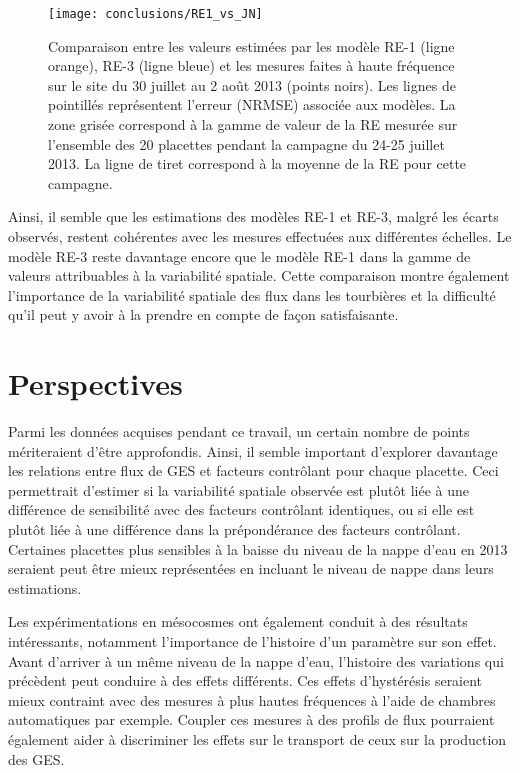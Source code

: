 \begin{figure}
\centering
\texttt{[image: conclusions/RE1\_vs\_JN]}
\caption{Comparaison entre les valeurs estimées par les modèle RE-1 (ligne orange), RE-3 (ligne bleue) et les mesures faites à haute fréquence sur le site du 30 juillet au 2 août 2013 (points noirs). Les lignes de pointillés représentent l'erreur (NRMSE) associée aux modèles. La zone grisée correspond à la gamme de valeur de la RE mesurée sur l'ensemble des 20 placettes pendant la campagne du 24-25 juillet 2013. La ligne de tiret correspond à la moyenne de la RE pour cette campagne.}
\label{fig:RE1_vs_JN}
\end{figure}

Ainsi, il semble que les estimations des modèles RE-1 et RE-3, malgré les écarts observés, restent cohérentes avec les mesures effectuées aux différentes échelles.
Le modèle RE-3 reste davantage encore que le modèle RE-1 dans la gamme de valeurs attribuables à la variabilité spatiale.
Cette comparaison montre également l'importance de la variabilité spatiale des flux dans les tourbières et la difficulté qu'il peut y avoir à la prendre en compte de façon satisfaisante.



\section*{Perspectives}

Parmi les données acquises pendant ce travail, un certain nombre de points mériteraient d'être approfondis.
Ainsi, il semble important d'explorer davantage les relations entre flux de GES et facteurs contrôlant pour chaque placette.
Ceci permettrait d'estimer si la variabilité spatiale observée est plutôt liée à une différence de sensibilité avec des facteurs contrôlant identiques, ou si elle est plutôt liée à une différence dans la prépondérance des facteurs contrôlant.
Certaines placettes plus sensibles à la baisse du niveau de la nappe d'eau en 2013 seraient peut être mieux représentées en incluant le niveau de nappe dans leurs estimations.

Les expérimentations en mésocosmes ont également conduit à des résultats intéressants, notamment l'importance de l'histoire d'un paramètre sur son effet.
Avant d'arriver à un même niveau de la nappe d'eau, l'histoire des variations qui précèdent peut conduire à des effets différents.
Ces effets d'hystérésis seraient mieux contraint avec des mesures à plus hautes fréquences à l'aide de chambres automatiques par exemple.
Coupler ces mesures à des profils de flux pourraient également aider à discriminer les effets sur le transport de ceux sur la production des GES.

